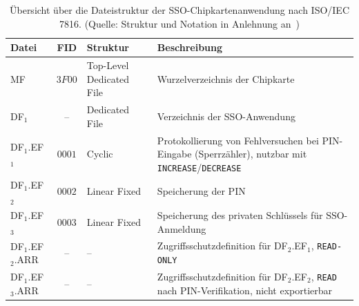 \begin{table}[h]
    \setlength{\tabcolsep}{0.5em}
    \def\arraystretch{1.5}
    \centering
    \begin{tabular}{|l|c|l|p{7cm}|}
        \hline
        \textbf{Datei} & \textbf{FID} & \textbf{Struktur} & \textbf{Beschreibung} \\
        \hline
        MF & $3F00$ & Top-Level Dedicated File & Wurzelverzeichnis der Chipkarte \\
        \hline
        DF$_1$ & -- & Dedicated File & Verzeichnis der SSO-Anwendung \\
        \hline
        DF$_1$.EF$_1$ & $0001$ & Cyclic & Protokollierung von Fehlversuchen bei PIN-Eingabe (Sperrzähler), nutzbar mit \texttt{INCREASE}/\texttt{DECREASE} \\
        \hline
        DF$_1$.EF$_2$ & $0002$ & Linear Fixed & Speicherung der PIN \\
        \hline
        DF$_1$.EF$_3$ & $0003$ & Linear Fixed & Speicherung des privaten Schlüssels für SSO-Anmeldung \\
        \hline
        DF$_1$.EF$_2$.ARR & -- & -- & Zugriffsschutzdefinition für DF$_2$.EF$_1$, \texttt{READ-ONLY} \\
        \hline
        DF$_1$.EF$_3$.ARR & -- & -- & Zugriffsschutzdefinition für DF$_2$.EF$_2$, \texttt{READ} nach PIN-Verifikation, nicht exportierbar \\
        \hline
    \end{tabular}
\caption{Übersicht über die Dateistruktur der SSO-Chipkartenanwendung nach ISO/IEC 7816. (Quelle: Struktur und Notation in Anlehnung an~\cite[\textbf{Tabelle 15.11}, 897]{RE02})}
\label{tab:struktur}
\end{table}


